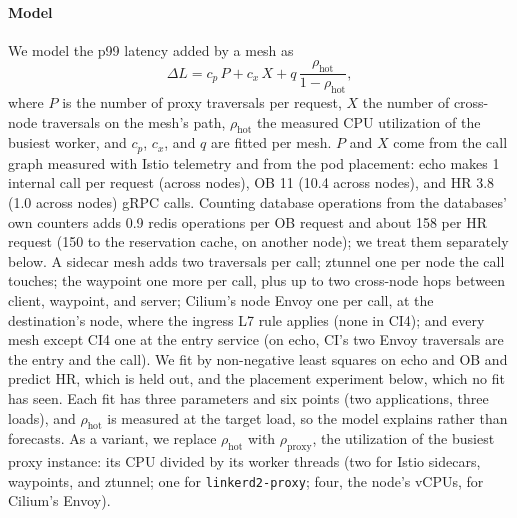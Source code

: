 \paragraph{Model}
We model the p99 latency added by a mesh as
\begin{equation}
  \Delta L = c_{p}\, P + c_{x}\, X + q\, \frac{\rho_{\text{hot}}}{1-\rho_{\text{hot}}},
  \label{eq:model}
\end{equation}
where $P$ is the number of proxy traversals per request, $X$ the number of
cross-node traversals on the mesh's path, $\rho_{\text{hot}}$ the measured CPU
utilization of the busiest worker, and $c_p$, $c_x$, and $q$ are fitted per
mesh. $P$ and $X$ come from the call graph measured with Istio telemetry and
from the pod placement: echo makes 1 internal call per request (across
nodes), OB 11 (10.4 across nodes), and HR 3.8 (1.0 across nodes) gRPC calls.
Counting database operations from the databases' own counters adds 0.9
redis operations per OB request and about 158 per HR request (150 to the
reservation cache, on another node); we treat them separately below. A sidecar
mesh adds two traversals per call; ztunnel one per node the call touches; the
waypoint one more per call, plus up to two cross-node hops between client,
waypoint, and server; Cilium's node Envoy one per call, at the destination's
node, where the ingress L7 rule applies (none in CI4); and every mesh except
CI4 one at the entry service (on echo, CI's two Envoy traversals are the entry
and the call). We fit by non-negative least
squares on echo and OB and predict HR, which is held out, and the placement
experiment below, which no fit has seen. Each fit has three parameters and six
points (two applications, three loads), and $\rho_{\text{hot}}$ is measured at
the target load, so the model explains rather than forecasts. As a variant,
we replace
$\rho_{\text{hot}}$ with $\rho_{\text{proxy}}$, the utilization of the busiest
proxy instance: its CPU divided by its worker threads (two for Istio sidecars,
waypoints, and ztunnel; one for \texttt{linkerd2-proxy}; four, the node's
vCPUs, for Cilium's Envoy).

